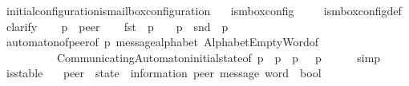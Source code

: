 \begin{isabellebody}
\isanewline
{}\isamarkupfalse%
\ initial{\isacharunderscore}{\kern0pt}configuration{\isacharunderscore}{\kern0pt}is{\isacharunderscore}{\kern0pt}mailbox{\isacharunderscore}{\kern0pt}configuration{\isacharcolon}{\kern0pt}\isanewline
\ \ \ {\isachardoublequoteopen}is{\isacharunderscore}{\kern0pt}mbox{\isacharunderscore}{\kern0pt}config\ {\isasymC}\isactrlsub {\isasymI}\isactrlsub {\isasymmm}{\isachardoublequoteclose}\isanewline
%
\isadelimproof
\ \ %
\endisadelimproof
%
\isatagproof
{}\isamarkupfalse%
\ is{\isacharunderscore}{\kern0pt}mbox{\isacharunderscore}{\kern0pt}config{\isacharunderscore}{\kern0pt}def\isanewline
{}\isamarkupfalse%
\ clarify\isanewline
\ \ \isamarkupfalse%
\ p\ {\isacharcolon}{\kern0pt}{\isacharcolon}{\kern0pt}\ {\isachardoublequoteopen}{\isacharprime}{\kern0pt}peer{\isachardoublequoteclose}\isanewline
\ \ \isamarkupfalse%
\ {\isachardoublequoteopen}fst\ {\isacharparenleft}{\kern0pt}{\isasymC}\isactrlsub {\isasymI}\isactrlsub {\isasymzero}\ p{\isacharcomma}{\kern0pt}\ {\isasymepsilon}{\isacharparenright}{\kern0pt}\ {\isasymin}\ {\isasymS}\ p\ {\isasymand}\ snd\ {\isacharparenleft}{\kern0pt}{\isasymC}\isactrlsub {\isasymI}\isactrlsub {\isasymzero}\ p{\isacharcomma}{\kern0pt}\ {\isasymepsilon}{\isacharparenright}{\kern0pt}\ {\isasymin}\ {\isasymM}\isactrlsup {\isacharasterisk}{\kern0pt}{\isachardoublequoteclose}\isanewline
\ \ \ \ \isamarkupfalse%
\ automaton{\isacharunderscore}{\kern0pt}of{\isacharunderscore}{\kern0pt}peer{\isacharbrackleft}{\kern0pt}of\ p{\isacharbrackright}{\kern0pt}\ message{\isacharunderscore}{\kern0pt}alphabet\ Alphabet{\isachardot}{\kern0pt}EmptyWord{\isacharbrackleft}{\kern0pt}of\ {\isasymM}{\isacharbrackright}{\kern0pt}\isanewline
\ \ \ \ \ \ \ \ \ \ CommunicatingAutomaton{\isachardot}{\kern0pt}initial{\isacharunderscore}{\kern0pt}state{\isacharbrackleft}{\kern0pt}of\ p\ {\isachardoublequoteopen}{\isasymS}\ p{\isachardoublequoteclose}\ {\isachardoublequoteopen}{\isasymI}\ p{\isachardoublequoteclose}\ {\isasymM}\ {\isachardoublequoteopen}{\isasymR}\ p{\isachardoublequoteclose}{\isacharbrackright}{\kern0pt}\isanewline
\ \ \ \ \isamarkupfalse%
\ simp\isanewline
{}\isamarkupfalse%
%
\endisatagproof
{\isafoldproof}%
%
\isadelimproof
\isanewline
%
\endisadelimproof
\isanewline
{}\isamarkupfalse%
\ is{\isacharunderscore}{\kern0pt}stable\isanewline
\ \ {\isacharcolon}{\kern0pt}{\isacharcolon}{\kern0pt}\ {\isachardoublequoteopen}{\isacharparenleft}{\kern0pt}{\isacharprime}{\kern0pt}peer\ {\isasymRightarrow}\ {\isacharparenleft}{\kern0pt}{\isacharprime}{\kern0pt}state\ {\isasymtimes}\ {\isacharparenleft}{\kern0pt}{\isacharprime}{\kern0pt}information{\isacharcomma}{\kern0pt}\ {\isacharprime}{\kern0pt}peer{\isacharparenright}{\kern0pt}\ message\ word{\isacharparenright}{\kern0pt}{\isacharparenright}{\kern0pt}\ {\isasymRightarrow}\ bool{\isachardoublequoteclose}\ \isanewline

\end{isabellebody}
